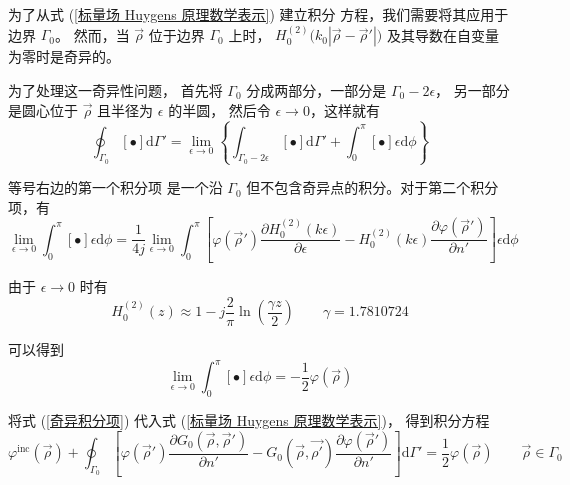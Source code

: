 \par 为了从式 (\ref{标量场 Huygens 原理数学表示}) 建立积分
方程，我们需要将其应用于边界 $\Gamma_0$。
然而，当 $\vec{\rho}$ 位于边界 $\Gamma_0$ 上时，
$H_0^{(2)}\Big(k_0\left|\vec{\rho}-\vec{\rho}'\right|\Big)$ 及其导数在自变量为零时是奇异的。
\par 为了处理这一奇异性问题，
首先将 $\Gamma_0$ 分成两部分，一部分是 $\Gamma_0-2\epsilon$，
另一部分是圆心位于 $\vec{\rho}$ 且半径为 $\epsilon$ 的半圆，
然后令 $\epsilon\rightarrow 0$，这样就有
\begin{equation}
    \oint_{\Gamma_0}[\bullet]\text{d}\Gamma'
    =\lim_{\epsilon\rightarrow 0}
    \left\{
        \int_{\Gamma_0-2\epsilon}[\bullet]\text{d}\Gamma'
        +\int_{0}^{\pi}[\bullet]\epsilon\text{d}\phi
    \right\}
\end{equation}
\par 等号右边的第一个积分项
是一个沿 $\Gamma_0$ 但不包含奇异点的积分。对于第二个积分项，有
\begin{equation}
    \lim_{\epsilon\rightarrow 0}
    \int_{0}^{\pi}[\bullet]\epsilon\text{d}\phi
    =\frac{1}{4j}
    \lim_{\epsilon\rightarrow 0}
    \int_{0}^{\pi}\left[
        \varphi(\vec{\rho}') \frac{\partial H_0^{(2)}(k\epsilon)}{\partial \epsilon}
        -H_0^{(2)}(k\epsilon) \frac{\partial \varphi(\vec{\rho}')}{\partial n'}
    \right]\epsilon\text{d}\phi
\end{equation}
\par 由于 $\epsilon\rightarrow 0$ 时有
\begin{equation}
    H_0^{(2)}(z) \approx 
    1 - j\frac{2}{\pi}\ln\left(
        \frac{\gamma z}{2}
    \right) 
    \qquad
    \gamma = 1.7810724
\end{equation}
\par 可以得到
\begin{equation}
    \lim_{\epsilon\rightarrow 0}
    \int_{0}^{\pi}[\bullet]\epsilon\text{d}\phi
    =-\frac{1}{2}\varphi(\vec{\rho})
    \label{奇异积分项}
\end{equation}
\par 将式 (\ref{奇异积分项}) 代入式 (\ref{标量场 Huygens 原理数学表示})，
得到积分方程
\begin{equation}
    \varphi^{\text{inc}}(\vec{\rho}) +
    \oint_{\Gamma_0}\left[
        \varphi(\vec{\rho}') \frac{\partial G_0(\vec{\rho}, \vec{\rho}')}{\partial n'}
        -G_0(\vec{\rho}, \vec{\rho'}) \frac{\partial \varphi(\vec{\rho}')}{\partial n'}
    \right]
    \text{d}\Gamma'
    =\frac{1}{2}\varphi(\vec{\rho})
    \qquad
    \vec{\rho} \in \Gamma_0
    \label{标量场积分方程}
\end{equation}

